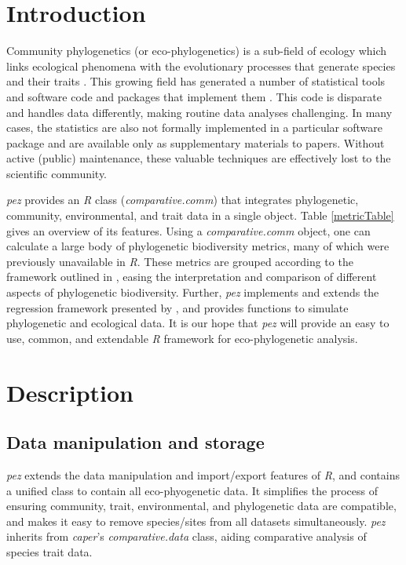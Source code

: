 \documentclass{bioinfo}
\begin{document}
\section{Introduction}
Community phylogenetics (or eco-phylogenetics) is a sub-field of
ecology which links ecological phenomena with the evolutionary
processes that generate species and their traits
\citep[see][]{Webb2002,Cavender-Bares2009}. This growing field has
generated a number of statistical tools and software code and packages
that implement them
\citep[\emph{e.g.},][]{Webb2008,Regetz2009,Kembel2010,Orme2013,Eastman2013}. This
code is disparate and handles data differently, making routine data
analyses challenging. In many cases, the statistics are also not
formally implemented in a particular software package and are
available only as supplementary materials to papers. Without active
(public) maintenance, these valuable techniques are effectively lost
to the scientific community.

\emph{pez} provides an \emph{R} \citep{R2014} class
(\emph{comparative.comm}) that integrates phylogenetic, community,
environmental, and trait data in a single object. Table
\ref{metricTable} gives an overview of its features. Using a
\emph{comparative.comm} object, one can calculate a large body of
phylogenetic biodiversity metrics, many of which were previously
unavailable in \emph{R}. These metrics are grouped according to the
framework outlined in \citet{Pearse2014review}, easing the
interpretation and comparison of different aspects of phylogenetic
biodiversity. Further, \emph{pez} implements and extends the
regression framework presented by \citep{Cavender-Bares2004}, and
provides functions to simulate phylogenetic and ecological data. It is
our hope that \emph{pez} will provide an easy to use, common, and
extendable \emph{R} framework for eco-phylogenetic analysis.
\section{Description}
\subsection{Data manipulation and storage}
\emph{pez} extends the data manipulation and import/export features of
\emph{R}, and contains a unified class to contain all eco-phyogenetic
data. It simplifies the process of ensuring community, trait,
environmental, and phylogenetic data are compatible, and makes it easy
to remove species/sites from all datasets simultaneously. \emph{pez}
inherits from \emph{caper}'s \citep{Orme2013} \emph{comparative.data}
class, aiding comparative analysis of species trait data.
\end{document}

